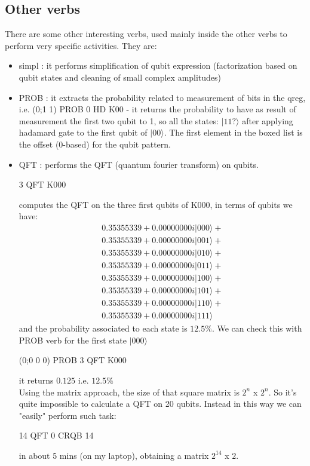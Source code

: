 \documentclass[a4paper,11pt]{amsbook}
\begin{document}
\subsection{Other verbs}

There are some other interesting verbs, used mainly inside the other verbs to 
perform very specific activities. They are:
\begin{itemize}
\item simpl : it performs simplification of qubit expression (factorization based on qubit states and cleaning of small complex amplitudes)
\item PROB : it extracts the probability related to measurement of bits in the qreg, i.e. (0;1 1) PROB 0 HD K00 - it returns the probability to have as result of measurement the first two qubit to 1, so all the states: $|11?\rangle$ after applying hadamard gate to the first qubit of $|00\rangle$. The first element in the boxed list is the offset (0-based) for the qubit pattern.
\item QFT : performs the QFT (quantum fourier transform) on qubits. 
\begin{center}
 3 QFT K000
\end{center} computes the QFT on the three first qubits of K000, in terms of qubits we have:
\[
\begin{array}{l}
0.35355339+0.00000000i |000\rangle +  \\
0.35355339+0.00000000i |001\rangle +  \\
0.35355339+0.00000000i |010\rangle +  \\
0.35355339+0.00000000i |011\rangle +  \\
0.35355339+0.00000000i |100\rangle +  \\
0.35355339+0.00000000i |101\rangle +  \\
0.35355339+0.00000000i |110\rangle +  \\
0.35355339+0.00000000i |111\rangle
\end{array}
\]
and the probability associated to each state is $12.5\%$. We can check this with PROB verb for the first state $|000\rangle$
\begin{center}
(0;0 0 0) PROB 3 QFT K000
\end{center}
it returns $0.125$ i.e. $12.5\%$ \\
Using the matrix approach, the size of that square matrix is $2^{n}$ x $2^{n}$. So it's quite impossible to calculate a QFT on 20 qubits. Instead in this way we can "easily" perform such task:
\begin{center}
14 QFT 0 CRQB 14
\end{center}
in about 5 mins (on my laptop), obtaining a matrix $2^{14}$ x $2$.
\end{itemize}
\end{document}
